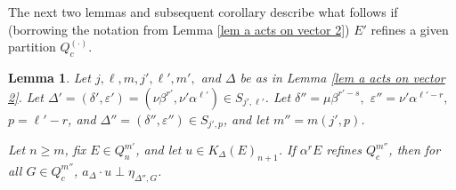 \documentclass[12pt]{amsart}
\newcommand{\al}{\alpha}
\newcommand{\be}{\beta}
\newcommand{\de}{\delta}
\newcommand{\De}{\Delta}
\newcommand{\ep}{\varepsilon}
\theoremstyle{plain} %
\newtheorem{Lemma}[Theorem]{Lemma}
\theoremstyle{definition} %
\begin{document}
The next two lemmas and  subsequent corollary describe what follows if (borrowing the notation from Lemma \ref{lem a acts on vector 2}) $E'$ refines a given partition $Q_c^{(\cdot)}$.

\begin{Lemma}\label{lem if E' refines (c=beta)}
    Let $j, \ell, m, j', \ell', m',$ and $\De$ be as in Lemma \ref{lem a acts on vector 2}. Let $\De'=(\de', \ep') = (\nu \be^{r'}, \nu' \al^{\ell'}) \in S_{j', \ell'}$. Let $\de'' = \mu \be^{r'-s},$ $\ep''= \nu' \al^{\ell'-r},$ $p = \ell'-r$, and $\De''=(\de'', \ep'') \in S_{j', p}$, and let $m'' = m(j', p)$.

    Let $n \geq m$, fix $E \in Q_n^{m'}$, and let $u \in K_{\De}(E)_{n+1}$. If $\al^r E$ refines $Q_c^{m''}$, then for all $G \in Q^{m''}_c$, $a_{\De} \cdot u \perp \eta_{\De'', G}$.
\end{Lemma}
\end{document}
